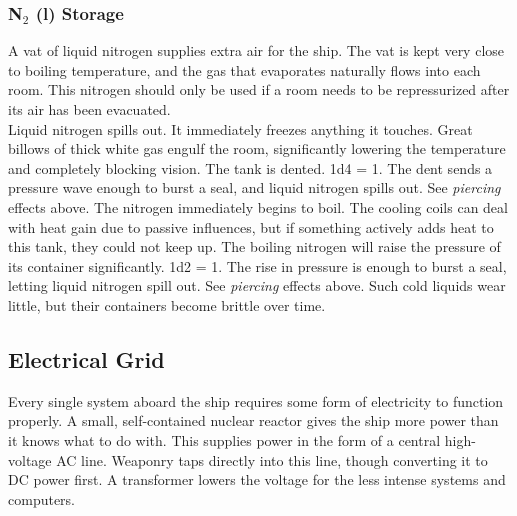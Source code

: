 \documentclass[a4paper]{article}
\begin{document}
\vspace{-0.5cm} \hspace{-18pt} \subsubsection{N$_2$ (l) Storage} \label{life_n2_storage} \vspace{-0.2cm}
A vat of liquid nitrogen supplies extra air for the ship. The vat is kept very close to boiling temperature, and the gas that evaporates naturally flows into each room. This nitrogen should only be used if a room needs to be repressurized after its air has been evacuated.
\\ \pbhw
{Liquid nitrogen spills out. It immediately freezes anything it touches. Great billows of thick white gas engulf the room, significantly lowering the temperature and completely blocking vision.}
{The tank is dented. \newline 1d4 = 1. The dent sends a pressure wave enough to burst a seal, and liquid nitrogen spills out. See \textit{piercing} effects above.}
{The nitrogen immediately begins to boil. The cooling coils can deal with heat gain due to passive influences, but if something actively adds heat to this tank, they could not keep up. The boiling nitrogen will raise the pressure of its container significantly. \newline 1d2 = 1. The rise in pressure is enough to burst a seal, letting liquid nitrogen spill out. See \textit{piercing} effects above.}
{Such cold liquids wear little, but their containers become brittle over time.}


\newpage
\subsection{Electrical Grid} \label{grid}

Every single system aboard the ship requires some form of electricity to function properly. A small, self-contained nuclear reactor gives the ship more power than it knows what to do with. This supplies power in the form of a central high-voltage AC line. Weaponry taps directly into this line, though converting it to DC power first. A transformer lowers the voltage for the less intense systems and computers.
\end{document}
